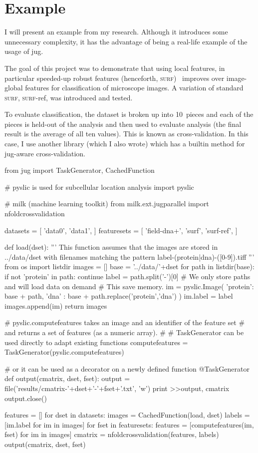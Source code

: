 \documentclass{article}
\begin{document}
\section{Example}
I will present an example from my research. Although it introduces some
unnecessary complexity, it has the advantage of being a real-life example of
the usage of jug.

The goal of this project was to demonstrate that using local features, in
particular speeded-up robust features (henceforth,
\textsc{surf})~\cite{surf-paper} improves over image-global features for
classification of microscope images. A variation of standard \textsc{surf},
\textsc{surf}-ref, was introduced and tested.

To evaluate classification, the dataset is broken up into 10~pieces and each of
the pieces is held-out of the analysis and then used to evaluate analysis (the
final result is the average of all ten values). This is known as
cross-validation. In this case, I use another library (which I also wrote)
which has a builtin method for jug-aware cross-validation.

\begin{python}
from jug import TaskGenerator, CachedFunction

# pyslic is used for subcellular location analysis
import pyslic

# milk (machine learning toolkit)
from milk.ext.jugparallel import nfoldcrossvalidation

datasets = [ 'data0', 'data1', ]
featuresets = [ 'field-dna+', 'surf', 'surf-ref', ]

def load(dset):
    '''
    This function assumes that the images are stored in ../data/dset with
    filenames matching the pattern
    label-(protein|dna)-([0-9]).tiff
    '''
    from os import listdir
    images = []
    base = '../data/'+dset
    for path in listdir(base):
        if not 'protein' in path: continue
        label = path.split('-')[0]
        # We only store paths and will load data on demand
        # This save memory.
        im = pyslic.Image({
                'protein': base + path,
                'dna' : base + path.replace('protein','dna')
                })
        im.label = label
        images.append(im)
    return images

# pyslic.computefeatures takes an image and an identifier of the feature set
# and returns a set of features (as a numeric array).
#
# TaskGenerator can be used directly to adapt existing functions
computefeatures = TaskGenerator(pyslic.computefeatures)

# or it can be used as a decorator on a newly defined function
@TaskGenerator
def output(cmatrix, dset, fset):
    output = file('results/cmatrix-'+dset+'-'+fset+'.txt', 'w')
    print >>output, cmatrix
    output.close()

features = []
for dset in datasets:
    images = CachedFunction(load, dset)
    labels = [im.label for im in images]
    for fset in featuresets:
        features = [computefeatures(im, fset) for im in images]
        cmatrix = nfoldcrossvalidation(features, labels)
        output(cmatrix, dset, fset)
\end{python}
\end{document}
